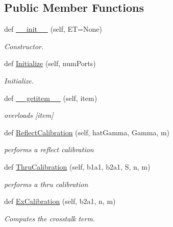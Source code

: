 \subsection*{Public Member Functions}
\begin{DoxyCompactItemize}
\item 
def \hyperlink{classSignalIntegrity_1_1Measurement_1_1Calibration_1_1ErrorTerms_1_1ErrorTerms_ad8cdadc2d29a11c5f69d487c0bf1a7a3}{\+\_\+\+\_\+init\+\_\+\+\_\+} (self, ET=None)
\begin{DoxyCompactList}\small\item\em Constructor. \end{DoxyCompactList}\item 
def \hyperlink{classSignalIntegrity_1_1Measurement_1_1Calibration_1_1ErrorTerms_1_1ErrorTerms_a76b02819f5b0a67b717af159f71f4ca3}{Initialize} (self, num\+Ports)
\begin{DoxyCompactList}\small\item\em Initialize. \end{DoxyCompactList}\item 
def \hyperlink{classSignalIntegrity_1_1Measurement_1_1Calibration_1_1ErrorTerms_1_1ErrorTerms_aab91ae2e037c39b631a69273c277bfe9}{\+\_\+\+\_\+getitem\+\_\+\+\_\+} (self, item)
\begin{DoxyCompactList}\small\item\em overloads \mbox{[}item\mbox{]} \end{DoxyCompactList}\item 
def \hyperlink{classSignalIntegrity_1_1Measurement_1_1Calibration_1_1ErrorTerms_1_1ErrorTerms_afb72282df42e631477c1658bc52a6a91}{Reflect\+Calibration} (self, hat\+Gamma, Gamma, m)
\begin{DoxyCompactList}\small\item\em performs a reflect calibration \end{DoxyCompactList}\item 
def \hyperlink{classSignalIntegrity_1_1Measurement_1_1Calibration_1_1ErrorTerms_1_1ErrorTerms_a06196443ad991bcdaccb2db32f396f00}{Thru\+Calibration} (self, b1a1, b2a1, S, n, m)
\begin{DoxyCompactList}\small\item\em performs a thru calibration \end{DoxyCompactList}\item 
def \hyperlink{classSignalIntegrity_1_1Measurement_1_1Calibration_1_1ErrorTerms_1_1ErrorTerms_a7dd89d542be158c0b13f2c0b7f2a852c}{Ex\+Calibration} (self, b2a1, n, m)
\begin{DoxyCompactList}\small\item\em Computes the crosstalk term. \end{DoxyCompactList}\item 

\end{DoxyCompactItemize}
